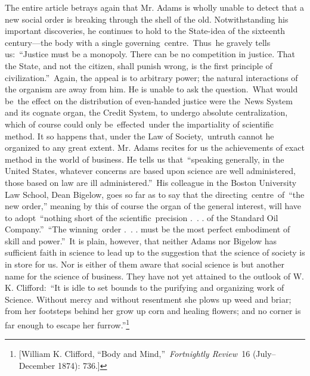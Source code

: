 \documentclass[twoside,symmetric,nobib,justified]{tufte-book}
\begin{document}
The entire article betrays again that Mr. Adams is wholly unable to
detect that a new social order is breaking through the shell of the old.
Notwithstanding his important discoveries, he continues to hold to the
State-idea of the sixteenth century---the body with a single
governing~centre.~Thus~he gravely tells us:~``Justice must be a
monopoly. There can be no competition in justice. That the State, and
not the citizen, shall punish wrong, is the first principle of
civilization.''~Again, the appeal is to arbitrary power; the natural
interactions of the organism are away from him. He is unable to ask the
question.~What would be~the effect on the distribution of even-handed
justice were the~News System and its cognate organ, the Credit System,
to undergo absolute centralization, which of course could only
be~effected~under the impartiality of scientific method. It so happens
that, under the Law of Society,~untruth cannot he organized to any great
extent. Mr. Adams recites for us the achievements of exact method in the
world of business. He tells us that~``speaking generally, in the United
States, whatever concerns are based upon science are well administered,
those based on law are ill administered.''~His colleague in the Boston
University Law School, Dean Bigelow, goes so far as to say that the
directing~centre~of~``the new order,'' meaning by this of course the
organ of the general interest, will have to adopt~``nothing short of the
scientific~precision .~. . of the Standard Oil Company.''~``The
winning~order .~. . must be the most perfect embodiment of skill and
power.''~It is plain, however, that neither Adams nor Bigelow has
sufficient faith in science to lead up to the suggestion that the
science of society is in store for us. Nor is either of them aware that
social science is but another name for the science of business. They
have not yet attained to the outlook of W. K. Clifford:~``It is idle to
set bounds to the purifying and organizing work of Science. Without
mercy and without resentment she plows up weed and briar; from her
footsteps behind her grow up corn and healing flowers; and no corner is
far enough to escape her furrow.''\footnote{{[}William K. Clifford,
  ``Body and Mind,''~\emph{Fortnightly Review~}16 (July--December 1874):
  736.{]}}
\end{document}
